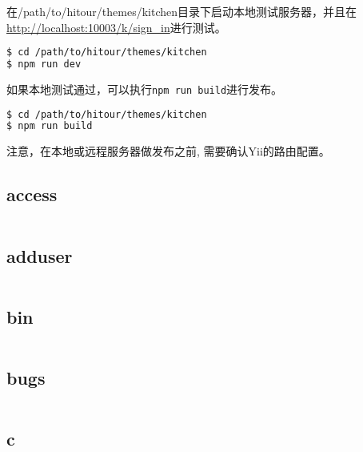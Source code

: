 在/path/to/hitour/themes/kitchen目录下启动本地测试服务器，并且在\url{http://localhost:10003/k/sign\_in}进行测试。

\begin{lstlisting}[language=bash]
$ cd /path/to/hitour/themes/kitchen
$ npm run dev
\end{lstlisting}

如果本地测试通过，可以执行\texttt{npm run build}进行发布。

\begin{lstlisting}[language=bash]
$ cd /path/to/hitour/themes/kitchen
$ npm run build
\end{lstlisting}

注意，在本地或远程服务器做发布之前, 需要确认Yii的路由配置。

\subsection{access}

\begin{lstlisting}[language=bash]

\end{lstlisting}

\subsection{adduser}

\begin{lstlisting}[language=bash]

\end{lstlisting}

\subsection{bin}


\begin{lstlisting}[language=bash]

\end{lstlisting}

\subsection{bugs}


\begin{lstlisting}[language=bash]

\end{lstlisting}

\subsection{c}



